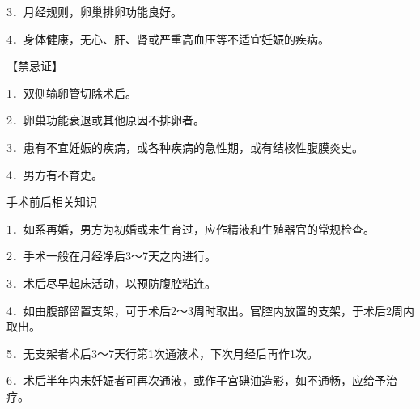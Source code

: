 \documentclass[12pt,UTF8,openany]{ctexbook}
\begin{document}
3．月经规则，卵巢排卵功能良好。

4．身体健康，无心、肝、肾或严重高血压等不适宜妊娠的疾病。

【禁忌证】

1．双侧输卵管切除术后。

2．卵巢功能衰退或其他原因不排卵者。

3．患有不宜妊娠的疾病，或各种疾病的急性期，或有结核性腹膜炎史。

4．男方有不育史。





手术前后相关知识


1．如系再婚，男方为初婚或未生育过，应作精液和生殖器官的常规检查。

2．手术一般在月经净后3～7天之内进行。

3．术后尽早起床活动，以预防腹腔粘连。

4．如由腹部留置支架，可于术后2～3周时取出。官腔内放置的支架，于术后2周内取出。

5．无支架者术后3～7天行第1次通液术，下次月经后再作1次。

6．术后半年内未妊娠者可再次通液，或作子宫碘油造影，如不通畅，应给予治疗。


\end{document}
